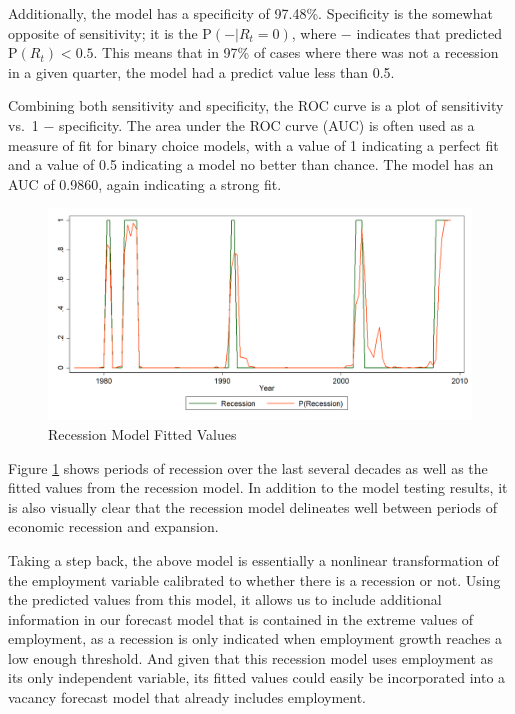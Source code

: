 \documentclass[10pt]{article}
\begin{document}
Additionally, the model has a specificity of 97.48\%.  Specificity is the somewhat opposite of sensitivity; it is the P$(-|R_t=0)$, where $-$ indicates that predicted P$(R_t)<0.5$.  This means that in 97\% of cases where there was not a recession in a given quarter, the model had a predict value less than 0.5.

Combining both sensitivity and specificity, the ROC curve is a plot of sensitivity vs.~1 $-$ specificity.  The area under the ROC curve (AUC) is often used as a measure of fit for binary choice models, with a value of 1 indicating a perfect fit and a value of 0.5 indicating a model no better than chance.  The model has an AUC of 0.9860, again indicating a strong fit.

\begin{figure}[h]
\begin{center}
\caption{Recession Model Fitted Values} \label{fig:rec}
\includegraphics[scale=0.22]{rec-fitted-6.png}
\end{center}
\end{figure}

Figure \ref{fig:rec} shows periods of recession over the last several decades as well as the fitted values from the recession model.  In addition to the model testing results, it is also visually clear that the recession model delineates well between periods of economic recession and expansion.

Taking a step back, the above model is essentially a nonlinear transformation of the employment variable calibrated to whether there is a recession or not.  Using the predicted values from this model, it allows us to include additional information in our forecast model that is contained in the extreme values of employment, as a recession is only indicated when employment growth reaches a low enough threshold.  And given that this recession model uses employment as its only independent variable, its fitted values could easily be incorporated into a vacancy forecast model that already includes employment.
\end{document}
